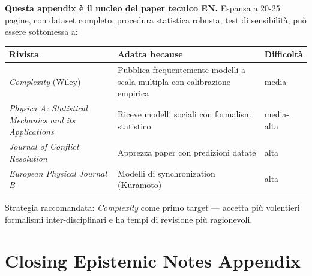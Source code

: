 \Hypoth{} \textbf{Questa appendix è il nucleo del paper tecnico EN.}
Espansa a 20-25 pagine, con dataset completo, procedura statistica
robusta, test di sensibilità, può essere sottomessa a:

{\def\LTcaptype{none} %
{\small\begin{longtable}[]{@{}
  >{\raggedright\arraybackslash}p{}
  >{\raggedright\arraybackslash}p{}
  >{\raggedright\arraybackslash}p{}@{}}
\toprule\noalign{}
\begin{minipage}[b]{\linewidth}\raggedright
Rivista
\end{minipage} & \begin{minipage}[b]{\linewidth}\raggedright
Adatta because
\end{minipage} & \begin{minipage}[b]{\linewidth}\raggedright
Difficoltà
\end{minipage} \\
\midrule\noalign{}
\endhead
\bottomrule\noalign{}
\endlastfoot
\emph{Complexity} (Wiley) & Pubblica frequentemente modelli a scala
multipla con calibrazione empirica & media \\
\emph{Physica A: Statistical Mechanics and its Applications} & Riceve
modelli sociali con formalism statistico & media-alta \\
\emph{Journal of Conflict Resolution} & Apprezza paper con predizioni
datate & alta \\
\emph{European Physical Journal B} & Modelli di synchronization
(Kuramoto) & alta \\
\end{longtable}}
}

Strategia raccomandata: \emph{Complexity} come primo target --- accetta
più volentieri formalismi inter-disciplinari e ha tempi di revisione più
ragionevoli.



\section{Closing Epistemic Notes
Appendix}\label{note-epistemiche-di-chiusura-appendix}

